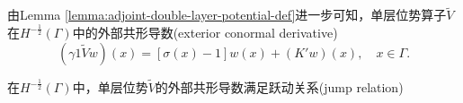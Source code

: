 由Lemma \ref{lemma:adjoint-double-layer-potential-def}进一步可知，单层位势算子$\widetilde{V}$在$H^{-\frac{1}{2}}(\Gamma)$中的外部共形导数(exterior conormal derivative)
\begin{equation*}
  \left( \gamma{1} \widetilde{V} w \right)(x) =
  \left[
  \sigma(x) - 1
  \right] w(x)
  + \left( K' w \right)(x), \quad x \in \Gamma.
\end{equation*}

\begin{lemma}[单层位势外部共形导数的跃动关系]
  \label{lemma:bvp-jump-relation}
  在$ H^{-\frac{1}{2}}(\Gamma)$中，单层位势$\widetilde{V}$的外部共形导数满足跃动关系(jump relation)
\end{lemma}
